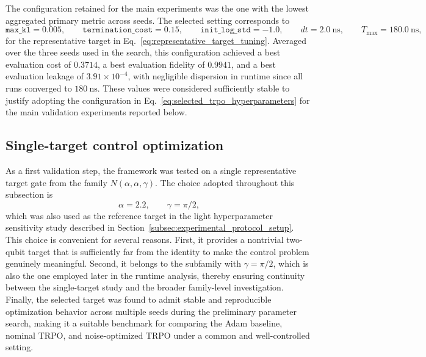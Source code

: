 The configuration retained for the main experiments was the one with the lowest aggregated primary metric across seeds. The selected setting corresponds to
\begin{equation}
\texttt{max\_kl}=0.005,
\qquad
\texttt{termination\_cost}=0.15,
\qquad
\texttt{init\_log\_std}=-1.0,
\qquad
dt=2.0~\mathrm{ns},
\qquad
T_{\max}=180.0~\mathrm{ns},
\label{eq:selected_trpo_hyperparameters}
\end{equation}
for the representative target in Eq.~\eqref{eq:representative_target_tuning}. Averaged over the three seeds used in the search, this configuration achieved a best evaluation cost of \(0.3714\), a best evaluation fidelity of \(0.9941\), and a best evaluation leakage of \(3.91\times 10^{-4}\), with negligible dispersion in runtime since all runs converged to \(180~\mathrm{ns}\). These values were considered sufficiently stable to justify adopting the configuration in Eq.~\eqref{eq:selected_trpo_hyperparameters} for the main validation experiments reported below. 


\subsection{Single-target control optimization}
\label{subsec:single_target_control_optimization}

As a first validation step, the framework was tested on a single representative target gate from the family \(N(\alpha,\alpha,\gamma)\). The choice adopted throughout this subsection is
\begin{equation}
\alpha = 2.2,
\qquad
\gamma = \pi/2,
\label{eq:representative_single_target}
\end{equation}
which was also used as the reference target in the light hyperparameter sensitivity study described in Section~\ref{subsec:experimental_protocol_setup}. This choice is convenient for several reasons. First, it provides a nontrivial two-qubit target that is sufficiently far from the identity to make the control problem genuinely meaningful. Second, it belongs to the subfamily with \(\gamma=\pi/2\), which is also the one employed later in the runtime analysis, thereby ensuring continuity between the single-target study and the broader family-level investigation. Finally, the selected target was found to admit stable and reproducible optimization behavior across multiple seeds during the preliminary parameter search, making it a suitable benchmark for comparing the Adam baseline, nominal TRPO, and noise-optimized TRPO under a common and well-controlled setting. 

